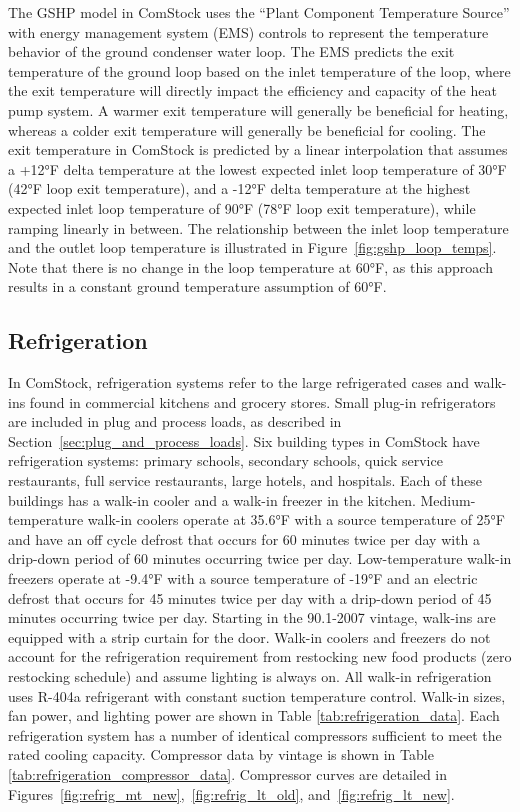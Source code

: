 The GSHP model in ComStock uses the ``Plant Component Temperature Source'' with energy management system (EMS) controls to represent the temperature behavior of the ground condenser water loop. The EMS predicts the exit temperature of the ground loop based on the inlet temperature of the loop, where the exit temperature will directly impact the efficiency and capacity of the heat pump system. A warmer exit temperature will generally be beneficial for heating, whereas a colder exit temperature will generally be beneficial for cooling. The exit temperature in ComStock is predicted by a linear interpolation that assumes a +12°F delta temperature at the lowest expected inlet loop temperature of 30°F (42°F loop exit temperature), and a -12°F delta temperature at the highest expected inlet loop temperature of 90°F (78°F loop exit temperature), while ramping linearly in between. The relationship between the inlet loop temperature and the outlet loop temperature is illustrated in Figure~\ref{fig:gshp_loop_temps}. Note that there is no change in the loop temperature at 60°F, as this approach results in a constant ground temperature assumption of 60°F.

\subsection{Refrigeration}
In ComStock, refrigeration systems refer to the large refrigerated cases and walk-ins found in commercial kitchens and grocery stores. Small plug-in refrigerators are included in plug and process loads, as described in Section~\ref{sec:plug_and_process_loads}. Six building types in ComStock have refrigeration systems: primary schools, secondary schools, quick service restaurants, full service restaurants, large hotels, and hospitals.  Each of these buildings has a walk-in cooler and a walk-in freezer in the kitchen.  Medium-temperature walk-in coolers operate at 35.6°F with a source temperature of 25°F and have an off cycle defrost that occurs for 60 minutes twice per day with a drip-down period of 60 minutes occurring twice per day.  Low-temperature walk-in freezers operate at -9.4°F with a source temperature of -19°F and an electric defrost that occurs for 45 minutes twice per day with a drip-down period of 45 minutes occurring twice per day. Starting in the 90.1-2007 vintage, walk-ins are equipped with a strip curtain for the door.  Walk-in coolers and freezers do not account for the refrigeration requirement from restocking new food products (zero restocking schedule) and assume lighting is always on.  All walk-in refrigeration uses R-404a refrigerant with constant suction temperature control.  Walk-in sizes, fan power, and lighting power are shown in Table \ref{tab:refrigeration_data}.  Each refrigeration system has a number of identical compressors sufficient to meet the rated cooling capacity.  Compressor data by vintage is shown in Table \ref{tab:refrigeration_compressor_data}.  Compressor curves are detailed in Figures~\ref{fig:refrig_mt_new},~\ref{fig:refrig_lt_old}, and~\ref{fig:refrig_lt_new}.
